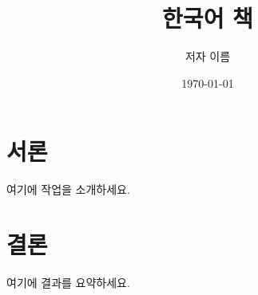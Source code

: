 \documentclass[11pt]{book}
\title{한국어 책}
\author{저자 이름}
\date{\today}
\begin{document}
\maketitle
\tableofcontents

\chapter{서론}
여기에 작업을 소개하세요.

\chapter{결론}
여기에 결과를 요약하세요.
\end{document}
